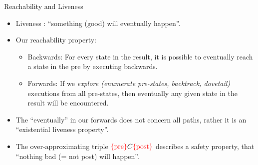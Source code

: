 \documentclass[
  10pt,
  ignorenonframetext,
]{beamer}
\newcommand{\red}[1]{\textcolor{red}{#1}}
\begin{document}
\begin{frame}{Reachability and Liveness}
\label{reachability-and-liveness}
\begin{itemize}
\item
  Liveness : ``something (good) will eventually happen''.
\item
  Our reachability property:

  \begin{itemize}
  \item
    Backwards: For every state in the result, it is possible to
    eventually reach a state in the pre by executing backwards.
  \item
    Forwards: If we \emph{explore (enumerate pre-states, backtrack,
    dovetail)} executions from all pre-states, then eventually any given
    state in the result will be encountered.
  \end{itemize}
\item
  The ``eventually'' in our forwards does not concern all paths, rather
  it is an ``existential liveness property''.
\item
  The over-approximating triple
  \(\red{\{\text{pre}\}}C\red{\{\text{post}\}}\) describes a safety
  property, that ``nothing bad (= not post) will happen''.
\end{itemize}
\end{frame}
\end{document}

